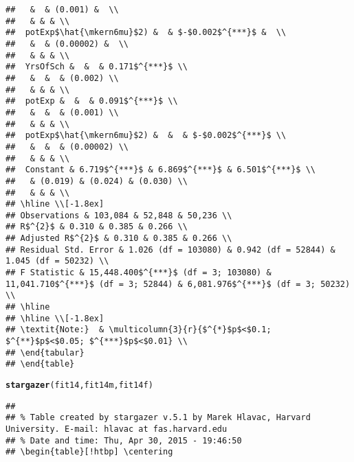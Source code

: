 \documentclass{article}\usepackage[]{graphicx}\usepackage[]{color}
\makeatletter
\newcommand{\hlstd}[1]{\textcolor[rgb]{0.345,0.345,0.345}{#1}}%
\newcommand{\hlkwd}[1]{\textcolor[rgb]{0.737,0.353,0.396}{\textbf{#1}}}%
\newenvironment{kframe}{%
 \def\at@end@of@kframe{}%
 \ifinner\ifhmode%
  \def\at@end@of@kframe{\end{minipage}}%
  \begin{minipage}{\columnwidth}%
 \fi\fi%
 \def\FrameCommand##1{\hskip\@totalleftmargin \hskip-\fboxsep
 \colorbox{shadecolor}{##1}\hskip-\fboxsep
     \hskip-\linewidth \hskip-\@totalleftmargin \hskip\columnwidth}%
 \MakeFramed {\advance\hsize-\width
   \@totalleftmargin\z@ \linewidth\hsize
   \@setminipage}}%
 {\par\unskip\endMakeFramed%
 \at@end@of@kframe}
\newenvironment{knitrout}{}{} %
\makeatother
\begin{document}
\begin{knitrout}
\begin{kframe}
\begin{verbatim}
##   &  & (0.001) &  \\ 
##   & & & \\ 
##  potExp$\hat{\mkern6mu}$2) &  & $-$0.002$^{***}$ &  \\ 
##   &  & (0.00002) &  \\ 
##   & & & \\ 
##  YrsOfSch &  &  & 0.171$^{***}$ \\ 
##   &  &  & (0.002) \\ 
##   & & & \\ 
##  potExp &  &  & 0.091$^{***}$ \\ 
##   &  &  & (0.001) \\ 
##   & & & \\ 
##  potExp$\hat{\mkern6mu}$2) &  &  & $-$0.002$^{***}$ \\ 
##   &  &  & (0.00002) \\ 
##   & & & \\ 
##  Constant & 6.719$^{***}$ & 6.869$^{***}$ & 6.501$^{***}$ \\ 
##   & (0.019) & (0.024) & (0.030) \\ 
##   & & & \\ 
## \hline \\[-1.8ex] 
## Observations & 103,084 & 52,848 & 50,236 \\ 
## R$^{2}$ & 0.310 & 0.385 & 0.266 \\ 
## Adjusted R$^{2}$ & 0.310 & 0.385 & 0.266 \\ 
## Residual Std. Error & 1.026 (df = 103080) & 0.942 (df = 52844) & 1.045 (df = 50232) \\ 
## F Statistic & 15,448.400$^{***}$ (df = 3; 103080) & 11,041.710$^{***}$ (df = 3; 52844) & 6,081.976$^{***}$ (df = 3; 50232) \\ 
## \hline 
## \hline \\[-1.8ex] 
## \textit{Note:}  & \multicolumn{3}{r}{$^{*}$p$<$0.1; $^{**}$p$<$0.05; $^{***}$p$<$0.01} \\ 
## \end{tabular} 
## \end{table}
\end{verbatim}
\begin{alltt}
\hlkwd{stargazer}\hlstd{(fit14, fit14m, fit14f)}
\end{alltt}
\begin{verbatim}
## 
## % Table created by stargazer v.5.1 by Marek Hlavac, Harvard University. E-mail: hlavac at fas.harvard.edu
## % Date and time: Thu, Apr 30, 2015 - 19:46:50
## \begin{table}[!htbp] \centering 

\end{verbatim}
\end{kframe}
\end{knitrout}
\end{document}
